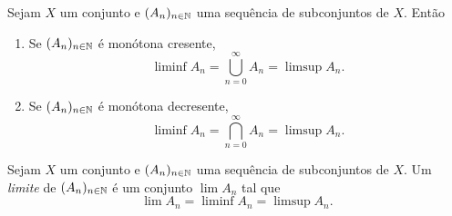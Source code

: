 \begin{prop}
	Sejam $X$ um conjunto e $(A_n)_{n \in \mathbb{N}}$ uma sequência de subconjuntos de $X$. Então
	\begin{enumerate}
	\item Se $(A_n)_{n \in \mathbb{N}}$ é monótona cresente,
	\begin{equation*}
	\liminf A_n = \bigcup_{n=0}^\infty A_n = \limsup A_n.
	\end{equation*}
	
	\item Se $(A_n)_{n \in \mathbb{N}}$ é monótona decresente,
	\begin{equation*}
	\liminf A_n = \bigcap_{n=0}^\infty A_n = \limsup A_n.
	\end{equation*}
	\end{enumerate}
\end{prop}

\begin{defi}
	Sejam $X$ um conjunto e $(A_n)_{n \in \mathbb{N}}$ uma sequência de subconjuntos de $X$. Um \emph{limite} de $(A_n)_{n \in \mathbb{N}}$ é um conjunto $\lim A_n$ tal que
	\begin{equation*}
	\lim A_n = \liminf A_n = \limsup A_n.
	\end{equation*}
\end{defi}


